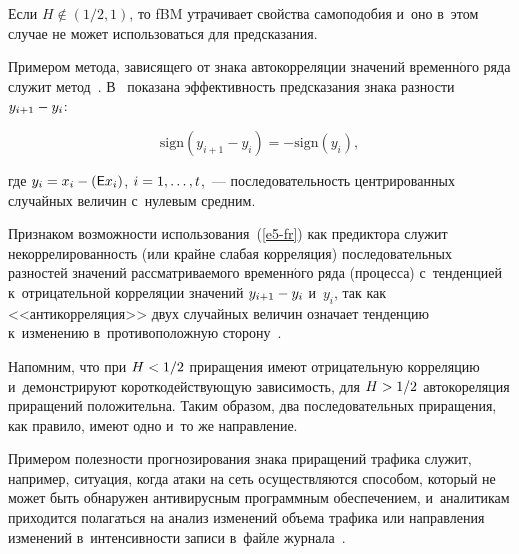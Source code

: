 \begin{multicols}{2}
   Если $H\not\in (1/2,1)$, то fBM утрачивает свойства самоподобия и~оно 
в~этом случае не может использоваться для предсказания. 
  
  Примером метода, зависящего от знака автокорреляции значений 
временн$\acute{\mbox{о}}$го ряда служит метод~\cite{19-fr}. В~\cite{19-fr, 20-fr} показана 
эффективность предсказания знака разности $y_{i+1}\hm- y_i$:

\vspace*{2pt}

\noindent
  \begin{equation}
  \mathrm{sign}\left(y_{i+1}- y_i\right)=- \mathrm{sign}\left(y_i\right),           
  \label{e5-fr}
  \end{equation}
  
   \vspace*{-4pt}
  
  \noindent
где $y_i = x_i \hm- ({\sf E}x_i)$, $i\hm= 1, \ldots, t$,~--- последовательность 
центрированных случайных величин с~нулевым средним.

  Признаком возможности использования~(\ref{e5-fr}) как предиктора 
служит некоррелированность (или\linebreak
 крайне слабая корреляция) 
последовательных разностей значений рассматриваемого временн$\acute{\mbox{о}}$го ряда 
(процесса) с~тенденцией к~отрицательной корреляции значений $y_{i+1}\hm- 
y_i$ и~$y_i$, так как \mbox{<<антикорреляция>>} двух случайных величин означает 
тенденцию к~изменению в~противоположную сторону~\cite{16-fr}.
  
  Напомним, что при $H \hm<1/2$ приращения имеют отрицательную 
корреляцию и~демонстрируют короткодействующую зависимость, для 
$H\hm>1/2$ автокореляция приращений положительна. Таким образом, два 
последовательных приращения, как правило, имеют одно и~то же 
направление.
  
  Примером полезности прогнозирования знака приращений трафика 
служит, например, ситуация, когда атаки на сеть осуществляются способом, 
который не может быть обнаружен антивирусным программным 
обеспечением, и~аналитикам приходится полагаться на анализ изменений 
объема трафика или направления изменений в~интенсивности записи в~файле 
журнала~\cite{14-fr}. 
  
\smallskip


\end{multicols}
